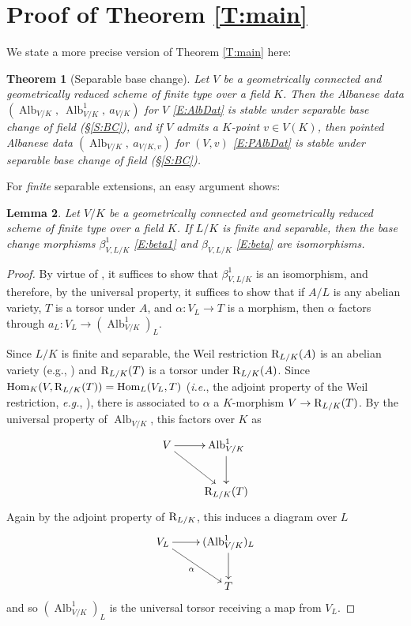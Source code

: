 \documentclass[11pt, reqno]{amsart}
\numberwithin{equation}{section}
\newtheorem{teo}{Theorem}[section]
\newtheorem{lem}[teo]{Lemma}
\theoremstyle{definition}
\theoremstyle{remark}
\def\res{{\bf\rm R}}
\DeclareMathOperator{\alb}{Alb}
\begin{document}
   






 \section{Proof of Theorem \ref{T:main}} \label{S:pfThmA}

We state a more precise version of Theorem \ref{T:main} here:

\begin{teo}[Separable base change]\label{T:mainAbody}
  Let $V$ be a
  geometrically connected and geometrically reduced 
  scheme of finite type over a field $K$.
    Then the Albanese data $(\operatorname{Alb}_{V/K},\ \operatorname{Alb}^1_{V/K},\  a_{V/K})$ for $V$  \eqref{E:AlbDat} is stable under \emph{separable} base change
  of field (\S\ref{S:BC}), and if $V$ admits a $K$-point 
   $v\in V(K)$, then 
    pointed Albanese
 data $(\operatorname{Alb}_{V/K}, \ a_{V/K,v})$ for $(V,v)$ \eqref{E:PAlbDat} is stable
  under \emph{separable} base change of field (\S\ref{S:BC}).
\end{teo}



 For \emph{finite} separable extensions, an easy argument shows:

 \begin{lem}
  \label{L:albBCfinsep}
  Let $V/K$ be a geometrically connected and geometrically reduced  
  scheme of finite type over a field $K$.
  If $L/K$ is finite and separable, then the base change morphisms $\beta^1_{V,L/K}$ \eqref{E:beta1} and
  $\beta_{V,L/K}$ \eqref{E:beta} are isomorphisms.
 \end{lem}

 \begin{proof} 
  By virtue of , it suffices to show that $\beta^1_{V,L/K}$ is an isomorphism, and therefore, 
  by the universal property, it suffices to show that if $A/L$ is any
  abelian variety, $T$ is a torsor under $A$, and $\alpha: V_L \to T$ is a
  morphism, then $\alpha$ factors through $a_L:V_L\to (\alb^1_{V/K})_L$.

  Since $L/K$ is finite and separable, the Weil restriction $\res_{L/K}(A)$ is an
  abelian
  variety  (e.g., \cite[\S 1]{milnearithmeticabvars}) 
      and
    $\res_{L/K}(T)$ is a torsor under $\res_{L/K}(A)$. 
    Since $\operatorname{Hom}_K(V,\res_{L/K}(T))=\operatorname{Hom}_L(V_L,T)$ (\emph{i.e.}, the adjoint property of the Weil restriction, \emph{e.g.}, \cite[p.~191, Lem.~1]{BLR}),
  there is associated to $\alpha$ a $K$-morphism $V \to \res_{L/K}(T)$.  By the universal property of
  $\alb_{V/K}$, this factors over $K$ as
  \[
  \xymatrix{
   V \ar[r] \ar[rd]& \alb^1_{V/K} \ar[d] \\
   &\res_{L/K}(T)
  }
  \]
  Again by the adjoint property of $\res_{L/K}$, this induces a diagram over $L$
  \[
  \xymatrix{
   V_L \ar[r] \ar[rd]_\alpha& (\alb^1_{V/K})_L \ar[d] \\
   &T
  }
  \]
  and so $(\alb^1_{V/K})_L$ is the universal torsor receiving a map from
  $V_L$.   
 \end{proof}
\end{document}
